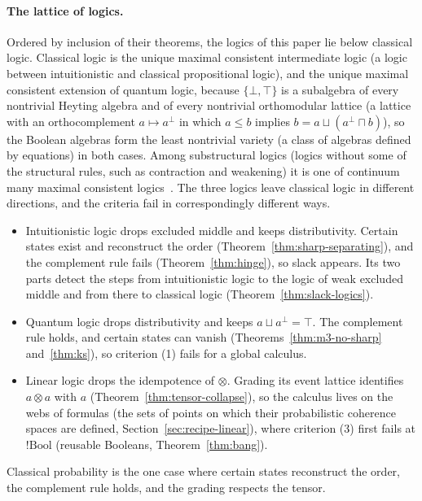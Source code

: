 \paragraph{The lattice of logics.}
Ordered by inclusion of their theorems, the logics of this paper lie
below classical logic. Classical logic is the unique maximal consistent
intermediate logic (a logic between intuitionistic and classical
propositional logic), and the unique maximal consistent extension of
quantum logic, because $\{\bot, \top\}$ is a subalgebra of every
nontrivial Heyting algebra and of every nontrivial orthomodular lattice
(a lattice with an orthocomplement $a \mapsto a^{\perp}$ in which
$a \le b$ implies $b = a \sqcup (a^{\perp} \sqcap b)$), so the Boolean
algebras form the least nontrivial variety (a class of algebras defined
by equations) in both cases. Among substructural logics (logics without
some of the structural rules, such as contraction and weakening) it is
one of continuum many maximal consistent logics~\cite{galatos2004}. The three logics leave classical
logic in different directions, and the criteria fail in correspondingly
different ways.
\begin{itemize}
  \item Intuitionistic logic drops excluded middle and keeps
  distributivity. Certain states exist and reconstruct the order
  (Theorem~\ref{thm:sharp-separating}), and the complement rule fails
  (Theorem~\ref{thm:hinge}), so slack appears. Its two parts detect the
  steps from intuitionistic logic to the logic of weak excluded middle
  and from there to classical logic (Theorem~\ref{thm:slack-logics}).
  \item Quantum logic drops distributivity and keeps
  $a \sqcup a^{\perp} = \top$. The complement rule holds, and certain
  states can vanish (Theorems~\ref{thm:m3-no-sharp} and~\ref{thm:ks}),
  so criterion (1) fails for a global calculus.
  \item Linear logic drops the idempotence of $\otimes$. Grading its
  event lattice identifies $a \otimes a$ with $a$
  (Theorem~\ref{thm:tensor-collapse}), so the calculus lives on the webs
  of formulas (the sets of points on which their probabilistic coherence
  spaces are defined, Section~\ref{sec:recipe-linear}), where criterion (3)
  first fails at $!\mathrm{Bool}$ (reusable Booleans,
  Theorem~\ref{thm:bang}).
\end{itemize}
Classical probability is the one case where certain states reconstruct
the order, the complement rule holds, and the grading respects the
tensor.
